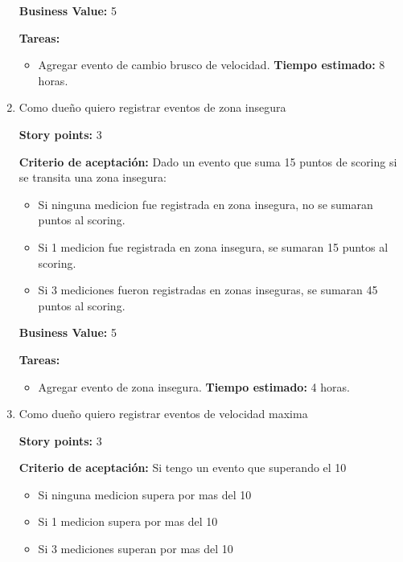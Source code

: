 \begin{enumerate}
\textbf{Business Value:} 5

\textbf{Tareas:}
	\begin{itemize}
		\item Agregar evento de cambio brusco de velocidad.
		\newline \textbf{Tiempo estimado:} 8 horas. 
	\end{itemize}






\item Como dueño quiero registrar eventos de zona insegura

\textbf{Story points:} 3

\textbf{Criterio de aceptación:}
Dado un evento que suma 15 puntos de scoring si se transita una zona insegura:
\begin{itemize}
	\item Si ninguna medicion fue registrada en zona insegura, no se sumaran puntos al scoring.
	\item Si 1 medicion fue registrada en zona insegura, se sumaran 15 puntos al scoring.
	\item Si 3 mediciones fueron registradas en zonas inseguras, se sumaran 45 puntos al scoring.
\end{itemize}

\textbf{Business Value:} 5

\textbf{Tareas:}
	\begin{itemize}
		\item Agregar evento de zona insegura.
		\newline \textbf{Tiempo estimado:} 4 horas. 
	\end{itemize}





\item Como dueño quiero registrar eventos de velocidad maxima

\textbf{Story points:} 3

\textbf{Criterio de aceptación:}
Si tengo un evento que superando el 10%
\begin{itemize}
	\item Si ninguna medicion supera por mas del 10%
	\item Si 1 medicion supera por mas del 10%
	\item Si 3 mediciones superan por mas del 10%
\end{itemize}


\end{enumerate}
